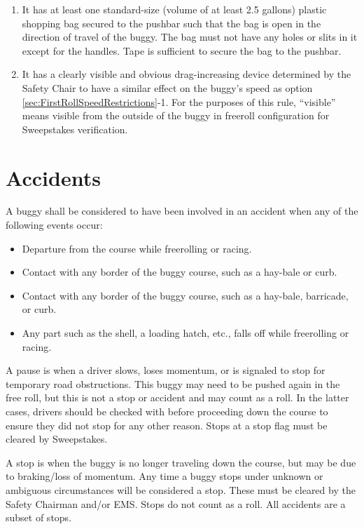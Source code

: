 	\begin{enumerate}
		\item It has at least one standard-size (volume of at least 2.5 gallons) plastic shopping bag secured to the pushbar such that the bag is open in the direction of travel of the buggy. The bag must not have any holes or slits in it except for the handles. Tape is sufficient to secure the bag to the pushbar.

		\item It has a clearly visible and obvious drag-increasing device determined by the Safety Chair to have a similar effect on the buggy's speed as option
		\ref{sec:FirstRollSpeedRestrictions}-1. For the purposes of this rule, “visible” means visible from the outside of the buggy in freeroll configuration for Sweepstakes verification. 
	\end{enumerate}

\section{Accidents}
\label{sec:Accidents}

	\noindent A buggy shall be considered to have been involved in an accident when any of the following events occur:

	\begin{itemize}
		\item Departure from the course while freerolling or racing.
		\item Contact with any border of the buggy course, such as a hay-bale or curb.
		\item Contact with any border of the buggy course, such as a hay-bale, barricade, or curb.
		\item Any part such as the shell, a loading hatch, etc., falls off while freerolling or racing.
	\end{itemize}

	A pause is when a driver slows, loses momentum, or is signaled to stop for temporary road obstructions. This buggy may need to be pushed again in the free roll, but this is not a stop or accident and may count as a roll. In the latter cases, drivers should be checked with before proceeding down the course to ensure they did not stop for any other reason. Stops at a stop flag must be cleared by Sweepstakes.

	A stop is when the buggy is no longer traveling down the course, but may be due to braking/loss of momentum. Any time a buggy stops under unknown or ambiguous circumstances will be considered a stop. These must be cleared by the Safety Chairman and/or EMS. Stops do not count as a roll. All accidents are a subset of stops. 
	
